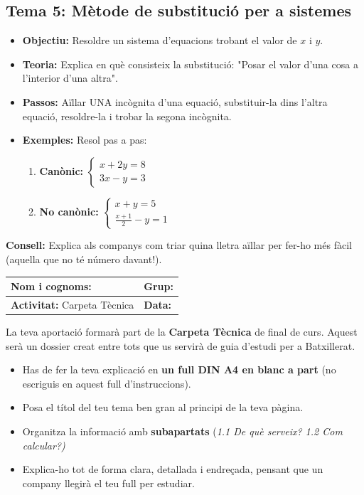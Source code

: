 \documentclass[12pt,a4paper]{article}
\newcommand{\introcomuna}{
    \begin{tcolorbox}[colback=gray!5,colframe=gray!50!black,title=\textbf{La Carpeta Tècnica de Matemàtiques}]
    La teva aportació formarà part de la \textbf{Carpeta Tècnica} de final de curs. Aquest serà un dossier creat entre tots que us servirà de guia d'estudi per a Batxillerat.
    
    \begin{itemize}[label=\textbullet, leftmargin=*]
        \item Has de fer la teva explicació en \textbf{un full DIN A4 en blanc a part} (no escriguis en aquest full d'instruccions).
        \item Posa el títol del teu tema ben gran al principi de la teva pàgina.
        \item Organitza la informació amb \textbf{subapartats} (\textit{1.1 De què serveix? 1.2 Com calcular?)}
        \item Explica-ho tot de forma clara, detallada i endreçada, pensant que un company llegirà el teu full per estudiar.
    \end{itemize}
    \end{tcolorbox}
    \vspace{0.1cm}
}
\newcommand{\capcaleraalumne}[1]{
    \begingroup
    \renewcommand{\arraystretch}{2.2}
    \begin{tabularx}{\textwidth}{|X|p{4cm}|}
    \hline
    \textbf{Nom i cognoms:} & \textbf{Grup:} \\ \hline
    \textbf{Activitat:} Carpeta Tècnica & \textbf{Data:} \\ \hline
    \end{tabularx}
    \endgroup
    \vspace{0.4cm}
}
\begin{document}
\subsection*{Tema 5: Mètode de substitució per a sistemes}
\begin{itemize}[label=\textbullet]
    \item \textbf{Objectiu:} Resoldre un sistema d'equacions trobant el valor de $x$ i $y$.
    \item \textbf{Teoria:} Explica en què consisteix la substitució: "Posar el valor d'una cosa a l'interior d'una altra".
    \item \textbf{Passos:} Aïllar UNA incògnita d'una equació, substituir-la dins l'altra equació, resoldre-la i trobar la segona incògnita.
    \item \textbf{Exemples:} Resol pas a pas:
    \begin{enumerate}[label=\alph*)]
        \item \textbf{Canònic:} $\begin{cases} x + 2y = 8 \\ 3x - y = 3 \end{cases}$
        \item \textbf{No canònic:} $\begin{cases} x + y = 5 \\ \displaystyle \frac{x+1}{2} - y = 1 \end{cases}$
    \end{enumerate}
\end{itemize}
\vfill
\noindent\textbf{Consell:} Explica als companys com triar quina lletra aïllar per fer-ho més fàcil (aquella que no té número davant!).

\newpage
\capcaleraalumne{6}
\introcomuna
\end{document}
